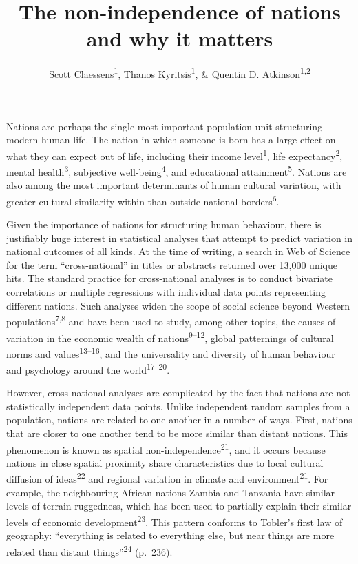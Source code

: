 \documentclass[
  man,floatsintext]{apa6}
\title{The non-independence of nations and why it matters}
\author{Scott Claessens\textsuperscript{1}, Thanos Kyritsis\textsuperscript{1}, \& Quentin D. Atkinson\textsuperscript{1,2}}
\date{}
\affiliation{\vspace{0.5cm}\textsuperscript{1} School of Psychology, University of Auckland, Auckland, New Zealand\\\textsuperscript{2} Max Planck Institute for Evolutionary Anthropology, Leipzig, Germany}
\begin{document}
\maketitle

Nations are perhaps the single most important population unit structuring modern human life. The nation in which someone is born has a large effect on what they can expect out of life, including their income level\textsuperscript{1}, life expectancy\textsuperscript{2}, mental health\textsuperscript{3}, subjective well-being\textsuperscript{4}, and educational attainment\textsuperscript{5}. Nations are also among the most important determinants of human cultural variation, with greater cultural similarity within than outside national borders\textsuperscript{6}.

Given the importance of nations for structuring human behaviour, there is justifiably huge interest in statistical analyses that attempt to predict variation in national outcomes of all kinds. At the time of writing, a search in Web of Science for the term ``cross-national'' in titles or abstracts returned over 13,000 unique hits. The standard practice for cross-national analyses is to conduct bivariate correlations or multiple regressions with individual data points representing different nations. Such analyses widen the scope of social science beyond Western populations\textsuperscript{7,8} and have been used to study, among other topics, the causes of variation in the economic wealth of nations\textsuperscript{9--12}, global patternings of cultural norms and values\textsuperscript{13--16}, and the universality and diversity of human behaviour and psychology around the world\textsuperscript{17--20}.

However, cross-national analyses are complicated by the fact that nations are not statistically independent data points. Unlike independent random samples from a population, nations are related to one another in a number of ways. First, nations that are closer to one another tend to be more similar than distant nations. This phenomenon is known as spatial non-independence\textsuperscript{21}, and it occurs because nations in close spatial proximity share characteristics due to local cultural diffusion of ideas\textsuperscript{22} and regional variation in climate and environment\textsuperscript{21}. For example, the neighbouring African nations Zambia and Tanzania have similar levels of terrain ruggedness, which has been used to partially explain their similar levels of economic development\textsuperscript{23}. This pattern conforms to Tobler's first law of geography: ``everything is related to everything else, but near things are more related than distant things''\textsuperscript{24} (p.~236).
\end{document}
